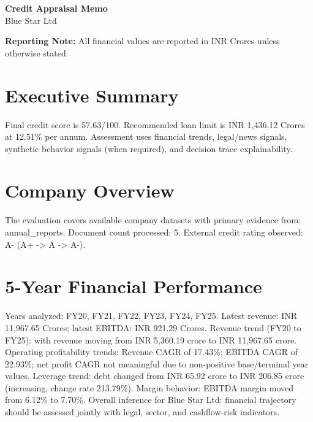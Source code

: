 \documentclass[11pt,a4paper]{article}
\begin{document}
\begin{center}
    {\LARGE \textbf{{Credit Appraisal Memo}}}\\[0.4em]
    {\large Blue Star Ltd}\\[0.2em]
\end{center}

\vspace{0.3em}
\colorbox{gray!12}{\parbox{\dimexpr\linewidth-2\fboxsep\relax}{\textbf{Reporting Note:} All financial values are reported in INR Crores unless otherwise stated.}}
\vspace{0.6em}

\section*{Executive Summary}
Final credit score is 57.63/100. Recommended loan limit is INR 1,436.12 Crores at 12.51\% per annum. Assessment uses financial trends, legal/news signals, synthetic behavior signals (when required), and decision trace explainability.

\section*{Company Overview}
The evaluation covers available company datasets with primary evidence from: annual\_reports. Document count processed: 5. External credit rating observed: A- (A+ -> A -> A-).

\section*{5-Year Financial Performance}
Years analyzed: FY20, FY21, FY22, FY23, FY24, FY25. Latest revenue: INR 11,967.65 Crores; latest EBITDA: INR 921.29 Crores. Revenue trend (FY20 to FY25): with revenue moving from INR 5,360.19 crore to INR 11,967.65 crore. Operating profitability trends: Revenue CAGR of 17.43\%; EBITDA CAGR of 22.93\%; net profit CAGR not meaningful due to non-positive base/terminal year values. Leverage trend: debt changed from INR 65.92 crore to INR 206.85 crore (increasing, change rate 213.79\%). Margin behavior: EBITDA margin moved from 6.12\% to 7.70\%. Overall inference for Blue Star Ltd: financial trajectory should be assessed jointly with legal, sector, and cashflow-risk indicators.
\end{document}
